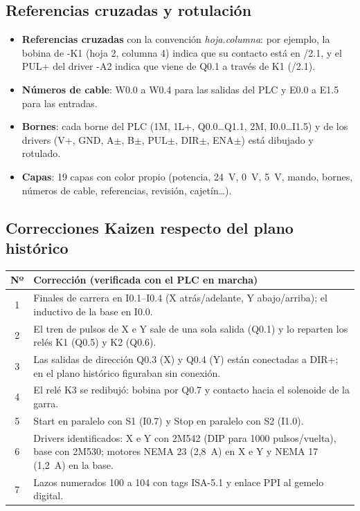 \documentclass[a4paper,11pt]{article}
\begin{document}
\subsection{Referencias cruzadas y rotulación}
\begin{itemize}
\item \textbf{Referencias cruzadas} con la convención \emph{hoja.columna}: por ejemplo, la bobina de -K1 (hoja 2, columna 4) indica que su contacto está en /2.1, y el PUL+ del driver -A2 indica que viene de Q0.1 a través de K1 (/2.1).
\item \textbf{Números de cable}: W0.0 a W0.4 para las salidas del PLC y E0.0 a E1.5 para las entradas.
\item \textbf{Bornes}: cada borne del PLC (1M, 1L+, Q0.0\dots Q1.1, 2M, I0.0\dots I1.5) y de los drivers (V+, GND, A$\pm$, B$\pm$, PUL$\pm$, DIR$\pm$, ENA$\pm$) está dibujado y rotulado.
\item \textbf{Capas}: 19 capas con color propio (potencia, 24~V, 0~V, 5~V, mando, bornes, números de cable, referencias, revisión, cajetín\dots).
\end{itemize}

\subsection{Correcciones Kaizen respecto del plano histórico}
\begin{center}\small
\begin{tabularx}{\linewidth}{c >{\raggedright\arraybackslash}X}
\toprule
\textbf{Nº} & \textbf{Corrección (verificada con el PLC en marcha)}\\
\midrule
1 & Finales de carrera en I0.1--I0.4 (X atrás/adelante, Y abajo/arriba); el inductivo de la base en I0.0.\\
2 & El tren de pulsos de X e Y sale de una sola salida (Q0.1) y lo reparten los relés K1 (Q0.5) y K2 (Q0.6).\\
3 & Las salidas de dirección Q0.3 (X) y Q0.4 (Y) están conectadas a DIR+; en el plano histórico figuraban sin conexión.\\
4 & El relé K3 se redibujó: bobina por Q0.7 y contacto hacia el solenoide de la garra.\\
5 & Start en paralelo con S1 (I0.7) y Stop en paralelo con S2 (I1.0).\\
6 & Drivers identificados: X e Y con 2M542 (DIP para 1000 pulsos/vuelta), base con 2M530; motores NEMA 23 (2,8~A) en X e Y y NEMA 17 (1,2~A) en la base.\\
7 & Lazos numerados 100 a 104 con tags ISA-5.1 y enlace PPI al gemelo digital.\\
\bottomrule
\end{tabularx}
\end{center}
\end{document}
